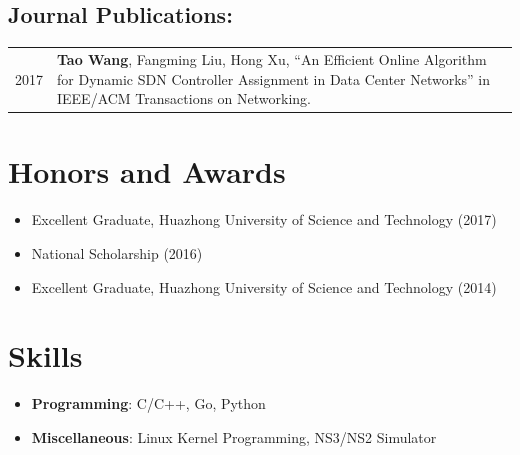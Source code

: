 \documentclass[10pt,fullpage]{article}
\begin{document}
\subsection*{Journal Publications:}
\begin{longtable}{p{0.5in}|p{5.5in}}
	2017 & \textbf{Tao Wang}, Fangming Liu, Hong Xu, ``An Efficient Online Algorithm for Dynamic SDN Controller Assignment in Data Center Networks'' in IEEE/ACM Transactions on Networking.
\end{longtable}

	

\section*{Honors and Awards}
\begin{itemize}
	\item Excellent Graduate, Huazhong University of Science and Technology (2017)
	\item National Scholarship (2016)
	\item Excellent Graduate, Huazhong University of Science and Technology (2014)
\end{itemize}

\section*{Skills}
\begin{itemize}
	\item \textbf{Programming}: C/C++, Go, Python
	\item \textbf{Miscellaneous}: Linux Kernel Programming, NS3/NS2 Simulator
\end{itemize}

\end{document}
